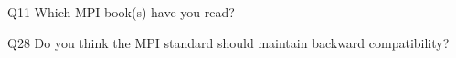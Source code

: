 \begin{description}%
\item{Q11} Which MPI book(s) have you read?%
\item{Q28} Do you think the MPI standard should maintain backward compatibility?%
\end{description}%
